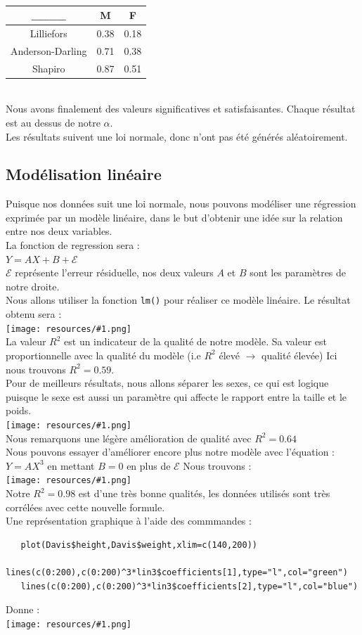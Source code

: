 \documentclass{report}
\newcommand{\photo}[1]{\\
    \texttt{[image: resources/\#1.png]}
\\
}
\begin{document}
\\\begin{tabular}{| c | c | c |}
  \hline
  \_\_\_\_ & \textbf{M} & \textbf{F} \\ \hline
  Lilliefors & 0.38 & 0.18\\ \hline
  Anderson-Darling & 0.71 & 0.38 \\ \hline
  Shapiro & 0.87 & 0.51 \\ \hline
\end{tabular}\\
Nous avons finalement des valeurs significatives et satisfaisantes.
Chaque résultat est au dessus de notre $\alpha$.\\
Les résultats suivent une loi normale, donc n'ont pas été
générés aléatoirement.
\subsection{Modélisation linéaire}
Puisque nos données suit une loi normale, nous pouvons modéliser
une régression exprimée par un modèle linéaire, dans le but
d'obtenir une idée sur la relation entre nos deux variables.\\
La fonction de regression sera : \\
$Y=AX+B+\mathcal{E}$ \\
$\mathcal{E}$ représente l'erreur résiduelle, nos deux valeurs $A$ et $B$ sont
les paramètres de notre droite.\\
Nous allons utiliser la fonction \texttt{lm()} pour réaliser
ce modèle linéaire. Le résultat obtenu sera :
\photo{26}
La valeur $R^2$ est un indicateur de la qualité de notre modèle.
Sa valeur est proportionnelle avec la qualité du modèle (i.e $R^2$ élevé $\longrightarrow$ qualité élevée)
Ici nous trouvons $R^2=0.59$.\\
Pour de meilleurs résultats, nous allons séparer les sexes,
ce qui est logique puisque le sexe est aussi un paramètre qui affecte
le rapport entre la taille et le poids.
\photo{27}
 Nous remarquons une légère amélioration de qualité avec
 $R^2=0.64$\\
 Nous pouvons essayer d'améliorer encore plus notre modèle
 avec l'équation : $Y=AX^3$ en mettant $B=0$ en plus de $\mathcal{E}$
 Nous trouvons :
 \photo{28}
 Notre $R^2=0.98$ est d'une très bonne qualités, les données
 utilisés sont très corrélées avec cette nouvelle formule.\\
 Une représentation graphique à l'aide des commmandes :
 \begin{verbatim}
   plot(Davis$height,Davis$weight,xlim=c(140,200))
   lines(c(0:200),c(0:200)^3*lin3$coefficients[1],type="l",col="green")
   lines(c(0:200),c(0:200)^3*lin3$coefficients[2],type="l",col="blue")
\end{verbatim}
 Donne :
 \photo{29}
\end{document}
